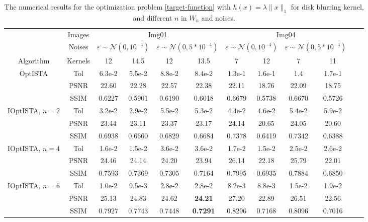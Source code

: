 \documentclass{article}
\begin{document}
\begin{table*}[thp]
\begin{center}
	\fontsize{6}{11}\selectfont
	\setlength{\tabcolsep}{1.2mm}
	\caption{The numerical results for the optimization problem \eqref{target-function} with $h(x)=\lambda\|x\|_{1}$ for disk blurring kernel, and  different $n$ in $W_{n}$ and noises. 
	} 
\label{real_Wn_table}
\begin{tabular}{c|c|c c | cc | cc| cc cc } 
	\hline 
	 & Images & \multicolumn{4}{c|}{Img01}  & \multicolumn{4}{c}{Img04}  \\\cline{2-10}
& Noises & \multicolumn{2}{c|}{$\varepsilon\sim\mathcal{N}(0,10^{-4})$} & \multicolumn{2}{c|}{$\varepsilon\sim\mathcal{N}(0,5*10^{-4})$} & \multicolumn{2}{c|}{$\varepsilon\sim\mathcal{N}(0,10^{-4})$} &  \multicolumn{2}{c}{$\varepsilon\sim\mathcal{N}(0,5*10^{-4})$}\\\cline{2-10}
	Algorithm & Kernels& 12 & 14.5 & 12 & 13.5 & 7 & 12  & 7 & 11  \\\hline
\multirow{3}{*}{OptISTA} & Tol & 6.3e-2 & 5.5e-2 &  8.8e-2 & 8.4e-2 & 1.3e-1 & 1.6e-1 & 1.4 & 1.7e-1\\
& PSNR &22.60 &  22.28&  22.57 & 22.38 & 22.11 & 18.76 & 22.09 & 18.75\\
& SSIM &0.6227 & 0.5901&  0.6190 & 0.6018 & 0.6679 & 0.5738 & 0.6670 & 0.5726\\ \hline
\multirow{3}{*}{IOptISTA, $n=2$} & Tol & 3.2e-2 & 2.9e-2&  5.5e-2 & 5.3e-2 & 4.4e-2 & 4.6e-2& 5.4e-2 & 5.9e-2\\
& PSNR & 23.44 & 23.11 &  23.37 & 23.17 & 24.14 & 20.65& 24.05 & 20.60\\
& SSIM & 0.6938 & 0.6660&  0.6829 & 0.6684 & 0.7378 & 0.6419& 0.7342 & 0.6388\\ \hline
\multirow{3}{*}{IOptISTA, $n=4$} & Tol & 1.6e-2 & 1.5e-2&  3.6e-2 & 3.6e-2 & 1.7e-2 & 1.5e-2 & 2.5e-2 & 2.6e-2\\
& PSNR & 24.46 & 24.14 &  24.20 & 23.94 & 26.14 & 22.18 & 25.79 & 22.01\\
& SSIM & 0.7593 & 0.7369 &  0.7305 & 0.7164 & 0.7995 & 0.6935& 0.7884 & 0.6850\\ \hline
\multirow{3}{*}{IOptISTA, $n=6$} & Tol & 1.0e-2 & 9.5e-3 &  2.8e-2 & 2.8e-2 & 8.2e-3 & 8.8e-3 & 1.5e-2 & 1.9e-2\\
& PSNR & 25.13 & 24.83 &  24.62 & \textbf{24.21} & 27.20 & 22.89 & 26.51 & 22.56\\
& SSIM & 0.7927 & 0.7743 &  0.7448 & \textbf{0.7291} & 0.8296 & 0.7168& 0.8096 & 0.7016\\ \hline

\end{tabular}
\end{center}
\end{table*}
\end{document}
